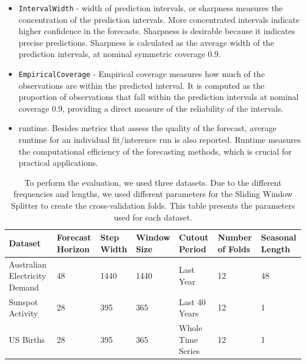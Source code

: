 \begin{itemize}
    \item \texttt{IntervalWidth} - width of prediction intervals, or sharpness measures the concentration of the prediction intervals. More concentrated intervals indicate higher confidence in the forecasts. Sharpness is desirable because it indicates precise predictions. Sharpness is calculated as the average width of the prediction intervals, at nominal symmetric coverage 0.9.
    \item \texttt{EmpiricalCoverage} - Empirical coverage measures how much of the observations are within the predicted interval. It is computed as the proportion of observations that fall within the prediction intervals at nominal coverage 0.9, providing a direct measure of the reliability of the intervals.
    \item runtime. Besides metrics that assess the quality of the forecast, average runtime for an individual fit/interence run is also reported. Runtime measures the computational efficiency of the forecasting methods, which is crucial for practical applications.
 
\end{itemize}

\begin{table}[h]
    \centering
    \footnotesize
    \caption{To perform the evaluation, we used three datasets. Due to the different frequencies and lengths, we used different parameters for the Sliding Window Splitter to create the cross-validation folds. This table presents the parameters used for each dataset.}
    \label{tab:evaluation_splits}
    \begin{tabularx}{\textwidth}{X|X|X|X|X|X|X}
         \toprule
        Dataset & Forecast Horizon & Step Width & Window Size & Cutout Period & Number of Folds & Seasonal Length \\ \midrule
        Australian Electricity Demand & 48 & 1440 & 1440 & Last Year & 12 & 48 \\ 
        Sunspot Activity & 28 & 395 & 365 & Last 40 Years & 12 & 1\\
        US Births & 28 & 395 & 365 & Whole Time Series & 12 & 1 \\
        \bottomrule
    \end{tabularx}
\end{table}


